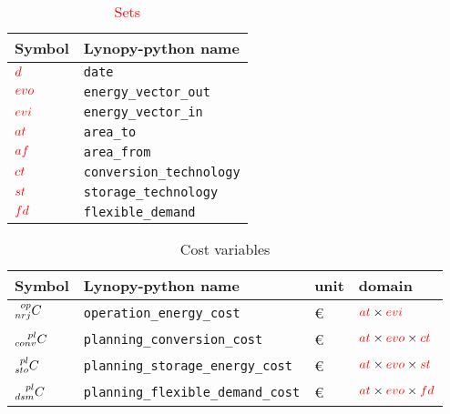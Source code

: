 \documentclass{article}
\begin{document}
\footnotesize
\begin{table}[h]
\footnotesize
  \centering
  \caption{\textcolor{red}{Sets} }
  \begin{tabular}{ll}
    \hline
    \textbf{Symbol} & \textbf{Lynopy-python name} \\ \hline
    $\textcolor{red}{d}$ & \verb|date|  \\  
    $\textcolor{red}{evo}$ & \verb|energy_vector_out|  \\
    $\textcolor{red}{evi}$ & \verb|energy_vector_in|  \\  
    $\textcolor{red}{at}$ & \verb|area_to|  \\ 
    $\textcolor{red}{af}$ & \verb|area_from|  \\ 
    $\textcolor{red}{ct}$ & \verb|conversion_technology|\\
    $\textcolor{red}{st}$ & \verb|storage_technology| \\
    $\textcolor{red}{fd}$ & \verb|flexible_demand| \\  \hline
  \end{tabular}
\end{table}

\begin{table}[h]
\footnotesize
  \centering
    \caption{Cost variables}
  \begin{tabular}{llll}
    \hline
    
    \textbf{Symbol} & \textbf{Lynopy-python name} & \textbf{unit}  & \textbf{domain} \\ \hline
    
    $\prescript{op}{nrj}{C}$  & \verb|operation_energy_cost|  & \euro & $\textcolor{red}{at} \times \textcolor{red}{evi}$\\ 

    $\prescript{pl}{conv}{C}$ & \verb|planning_conversion_cost|& \euro & $\textcolor{red}{at} \times \textcolor{red}{evo} \times \textcolor{red}{ct}$\\  

    $\prescript{pl}{sto}{C}$ & \verb|planning_storage_energy_cost|& \euro & $\textcolor{red}{at} \times \textcolor{red}{evo} \times \textcolor{red}{st}$ \\ 
    
    $\prescript{pl}{dsm}{C}$ & \verb|planning_flexible_demand_cost|& \euro & $\textcolor{red}{at} \times \textcolor{red}{evo} \times \textcolor{red}{fd}$ \\
    \hline
    
  \end{tabular}
\end{table}
\end{document}
